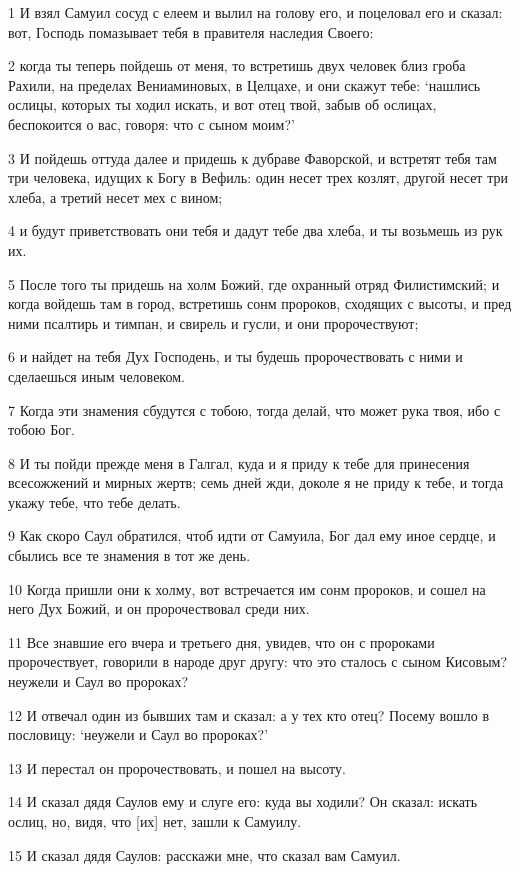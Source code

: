 \par 1 И взял Самуил сосуд с елеем и вылил на голову его, и поцеловал его и сказал: вот, Господь помазывает тебя в правителя наследия Своего:
\par 2 когда ты теперь пойдешь от меня, то встретишь двух человек близ гроба Рахили, на пределах Вениаминовых, в Целцахе, и они скажут тебе: `нашлись ослицы, которых ты ходил искать, и вот отец твой, забыв об ослицах, беспокоится о вас, говоря: что с сыном моим?'
\par 3 И пойдешь оттуда далее и придешь к дубраве Фаворской, и встретят тебя там три человека, идущих к Богу в Вефиль: один несет трех козлят, другой несет три хлеба, а третий несет мех с вином;
\par 4 и будут приветствовать они тебя и дадут тебе два хлеба, и ты возьмешь из рук их.
\par 5 После того ты придешь на холм Божий, где охранный отряд Филистимский; и когда войдешь там в город, встретишь сонм пророков, сходящих с высоты, и пред ними псалтирь и тимпан, и свирель и гусли, и они пророчествуют;
\par 6 и найдет на тебя Дух Господень, и ты будешь пророчествовать с ними и сделаешься иным человеком.
\par 7 Когда эти знамения сбудутся с тобою, тогда делай, что может рука твоя, ибо с тобою Бог.
\par 8 И ты пойди прежде меня в Галгал, куда и я приду к тебе для принесения всесожжений и мирных жертв; семь дней жди, доколе я не приду к тебе, и тогда укажу тебе, что тебе делать.
\par 9 Как скоро Саул обратился, чтоб идти от Самуила, Бог дал ему иное сердце, и сбылись все те знамения в тот же день.
\par 10 Когда пришли они к холму, вот встречается им сонм пророков, и сошел на него Дух Божий, и он пророчествовал среди них.
\par 11 Все знавшие его вчера и третьего дня, увидев, что он с пророками пророчествует, говорили в народе друг другу: что это сталось с сыном Кисовым? неужели и Саул во пророках?
\par 12 И отвечал один из бывших там и сказал: а у тех кто отец? Посему вошло в пословицу: `неужели и Саул во пророках?'
\par 13 И перестал он пророчествовать, и пошел на высоту.
\par 14 И сказал дядя Саулов ему и слуге его: куда вы ходили? Он сказал: искать ослиц, но, видя, что [их] нет, зашли к Самуилу.
\par 15 И сказал дядя Саулов: расскажи мне, что сказал вам Самуил.
